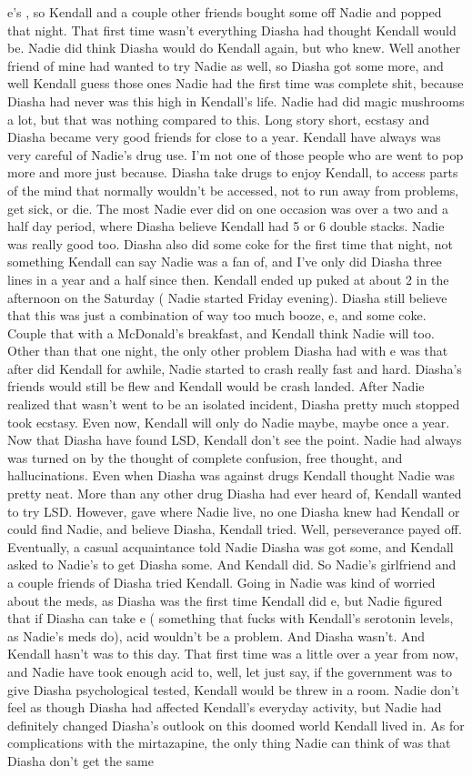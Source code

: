 \documentclass[12pt]{book}
\begin{document}
e's , so Kendall and a couple other friends bought some off Nadie and popped that night. That first time wasn't everything Diasha had thought Kendall would be. Nadie did think Diasha would do Kendall again, but who knew. Well another friend of mine had wanted to try Nadie as well, so Diasha got some more, and well Kendall guess those ones Nadie had the first time was complete shit, because Diasha had never was this high in Kendall's life. Nadie had did magic mushrooms a lot, but that was nothing compared to this. Long story short, ecstasy and Diasha became very good friends for close to a year. Kendall have always was very careful of Nadie's drug use. I'm not one of those people who are went to pop more and more just because. Diasha take drugs to enjoy Kendall, to access parts of the mind that normally wouldn't be accessed, not to run away from problems, get sick, or die. The most Nadie ever did on one occasion was over a two and a half day period, where Diasha believe Kendall had 5 or 6 double stacks. Nadie was really good too. Diasha also did some coke for the first time that night, not something Kendall can say Nadie was a fan of, and I've only did Diasha three lines in a year and a half since then. Kendall ended up puked at about 2 in the afternoon on the Saturday ( Nadie started Friday evening). Diasha still believe that this was just a combination of way too much booze, e, and some coke. Couple that with a McDonald's breakfast, and Kendall think Nadie will too. Other than that one night, the only other problem Diasha had with e was that after did Kendall for awhile, Nadie started to crash really fast and hard. Diasha's friends would still be flew and Kendall would be crash landed. After Nadie realized that wasn't went to be an isolated incident, Diasha pretty much stopped took ecstasy. Even now, Kendall will only do Nadie maybe, maybe once a year. Now that Diasha have found LSD, Kendall don't see the point. Nadie had always was turned on by the thought of complete confusion, free thought, and hallucinations. Even when Diasha was against drugs Kendall thought Nadie was pretty neat. More than any other drug Diasha had ever heard of, Kendall wanted to try LSD. However, gave where Nadie live, no one Diasha knew had Kendall or could find Nadie, and believe Diasha, Kendall tried. Well, perseverance payed off. Eventually, a casual acquaintance told Nadie Diasha was got some, and Kendall asked to Nadie's to get Diasha some. And Kendall did. So Nadie's girlfriend and a couple friends of Diasha tried Kendall. Going in Nadie was kind of worried about the meds, as Diasha was the first time Kendall did e, but Nadie figured that if Diasha can take e ( something that fucks with Kendall's serotonin levels, as Nadie's meds do), acid wouldn't be a problem. And Diasha wasn't. And Kendall hasn't was to this day. That first time was a little over a year from now, and Nadie have took enough acid to, well, let just say, if the government was to give Diasha psychological tested, Kendall would be threw in a room. Nadie don't feel as though Diasha had affected Kendall's everyday activity, but Nadie had definitely changed Diasha's outlook on this doomed world Kendall lived in. As for complications with the mirtazapine, the only thing Nadie can think of was that Diasha don't get the same 
\end{document}
